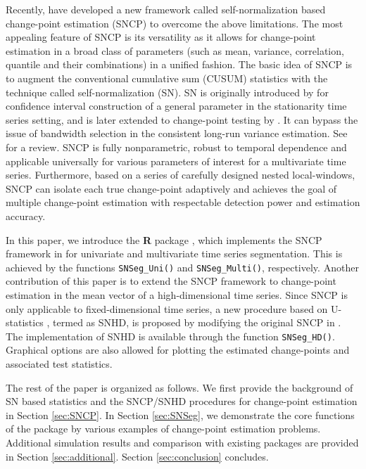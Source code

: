 Recently, \cite{zhao2021segmenting} have developed a new framework called  self-normalization  based change-point estimation (SNCP) to overcome the above limitations. The most appealing feature of SNCP is its versatility as it allows for change-point estimation in a broad class of parameters
(such as mean, variance, correlation, quantile and their combinations) in a unified fashion.  The basic idea of SNCP is to augment the conventional cumulative sum  (CUSUM) statistics with the technique called self-normalization (SN). SN is originally introduced by \cite{shao2010self} for confidence interval construction of a general parameter in the stationarity time series setting, and is later extended to change-point testing by \cite{shaozhang2010testing}. It can bypass the issue of bandwidth selection in the consistent long-run variance estimation. See \cite{shao2015} for a review. SNCP is fully nonparametric, robust to temporal dependence and applicable universally for various parameters of interest for a multivariate time series. Furthermore, based on  a series of carefully designed nested local-windows, SNCP can isolate each true change-point adaptively and achieves the goal of multiple change-point estimation with respectable detection power and estimation accuracy. 

In this paper, we  introduce the \textbf{R} package  \citep{SNSeg2023}, which implements the SNCP framework in \cite{zhao2021segmenting} for univariate and multivariate time series segmentation. This is achieved by the functions \texttt{SNSeg\_Uni()} and \texttt{SNSeg\_Multi()}, respectively. Another contribution of this paper is to extend the SNCP framework to change-point estimation in the mean vector of a high-dimensional time series. Since SNCP is only applicable to fixed-dimensional time series, a new procedure  based on U-statistics \citep{wang2022inference}, termed as SNHD, is proposed by modifying the original SNCP in \cite{zhao2021segmenting}. The implementation of SNHD is available through the function \texttt{SNSeg\_HD()}. Graphical options are also allowed for plotting the estimated change-points and associated test statistics. 

The rest of the paper is organized as follows. We first provide the background of SN based statistics and the SNCP/SNHD procedures for change-point estimation in Section \ref{sec:SNCP}. In Section \ref{sec:SNSeg}, we demonstrate the core functions of the package  by various examples of change-point estimation problems. {Additional simulation results and comparison with existing packages are provided in Section \ref{sec:additional}.} Section \ref{sec:conclusion} concludes.


